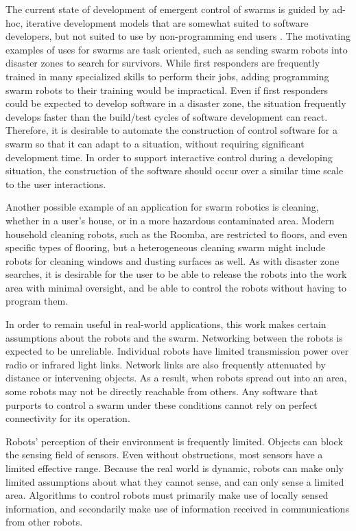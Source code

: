 The current state of development of emergent control of swarms is guided by ad-hoc, iterative development models that are somewhat suited to software developers, but not suited to use by non-programming end users \citep{palmer2005behavioral}.
The motivating examples of uses for swarms are task oriented, such as sending swarm robots into disaster zones to search for survivors. 
While first responders are frequently trained in many specialized skills to perform their jobs, adding programming swarm robots to their training would be impractical. 
Even if first responders could be expected to develop software in a disaster zone, the situation frequently develops faster than the build/test cycles of software development can react. 
Therefore, it is desirable to automate the construction of control software for a swarm so that it can adapt to a situation, without requiring significant development time. 
In order to support interactive control during a developing situation, the construction of the software should occur over a similar time scale to the user interactions.

Another possible example of an application for swarm robotics is cleaning, whether in a user's house, or in a more hazardous contaminated area. 
Modern household cleaning robots, such as the Roomba, are restricted to floors, and even specific types of flooring, but a heterogeneous cleaning swarm might include robots for cleaning windows and dusting surfaces as well. 
As with disaster zone searches, it is desirable for the user to be able to release the robots into the work area with minimal oversight, and be able to control the robots without having to program them. 

In order to remain useful in real-world applications, this work makes certain assumptions about the robots and the swarm. 
Networking between the robots is expected to be unreliable. 
Individual robots have limited transmission power over radio or infrared light links. 
Network links are also frequently attenuated by distance or intervening objects. 
As a result, when robots spread out into an area, some robots may not be directly reachable from others. 
Any software that purports to control a swarm under these conditions cannot rely on perfect connectivity for its operation. 

Robots' perception of their environment is frequently limited. 
Objects can block the sensing field of sensors.
Even without obstructions, most sensors have a limited effective range.
Because the real world is dynamic, robots can make only limited assumptions about what they cannot sense, and can only sense a limited area. 
Algorithms to control robots must primarily make use of locally sensed information, and secondarily make use of information received in communications from other robots. 

